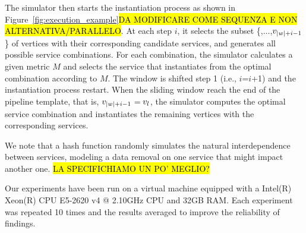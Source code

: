 The simulator then starts the instantiation process as shown in Figure~\ref{fig:execution_example}\hl{DA MODIFICARE COME SEQUENZA E NON ALTERNATIVA/PARALLELO}. At each step $i$, it selects the subset \{,$\ldots$,$v_{|w|+i-1}$\} of vertices with their corresponding candidate services, and generates all possible service combinations. For each combination, the simulator calculates a given metric $M$ and selects the service that instantiates  from the optimal combination according to $M$. The window is shifted step 1 (i.e., $i$=$i$+1) and the instantiation process restart. When the sliding window reach the end of the pipeline template, that is, $v_{|w|+i-1}$$=$$v_{l}$, the simulator computes the optimal service combination and instantiates the remaining vertices with the corresponding services.

We note that a hash function randomly simulates the natural interdependence between services, modeling a data removal on one service that might impact another one. \hl{LA SPECIFICHIAMO UN PO' MEGLIO?} %

Our experiments have been run on a virtual machine equipped with a Intel(R) Xeon(R) CPU E5-2620 v4 @ 2.10GHz CPU and 32GB RAM.
Each experiment was repeated 10 times and the results averaged to improve the reliability of findings.

